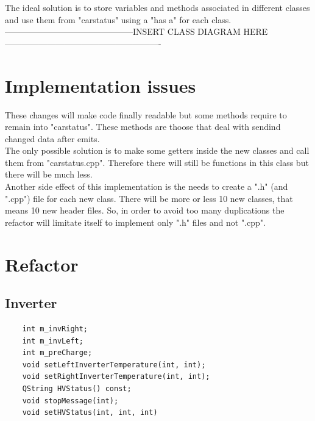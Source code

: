 \documentclass[12pt, letterpaper]{article}
\begin{document}
\begin{flushleft}
\newline
\newline
	The ideal solution is to store variables and methods associated in different classes and use them from "carstatus" using a "has a" for each class.\\
	---------------------------------------------INSERT CLASS DIAGRAM HERE-------------------------------------------------------

\section{Implementation issues}
	These changes will make code finally readable but some methods require to remain into "carstatus". These methods are thoose that deal with sendind changed data after emits.\\
	The only possible solution is to make some getters inside the new classes and call them from "carstatus.cpp". Therefore there will still be functions in this class but there will be much less.\\
	Another side effect of this implementation is the needs to create a ".h" (and ".cpp") file for each new class. There will be more or less 10 new classes, that means 10 new header files. So, in order to avoid too many duplications the refactor will limitate itself to implement only ".h" files and not ".cpp".

\section{Refactor}
\subsection{Inverter}
\begin{verbatim}
	int m_invRight;
	int m_invLeft;
	int m_preCharge;
	void setLeftInverterTemperature(int, int);
	void setRightInverterTemperature(int, int);
	QString HVStatus() const;
	void stopMessage(int);
	void setHVStatus(int, int, int)
\end{verbatim}

\end{flushleft}
\end{document}
